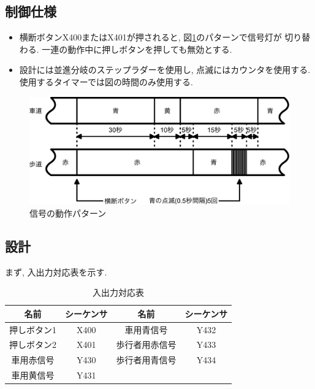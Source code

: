 \documentclass[titlepage]{jsarticle}
\begin{document}
  \subsection{制御仕様}
    \begin{itemize}
      \item 横断ボタンX400またはX401が押されると, 図\ref{fig:sig_pat}のパターンで信号灯が
        切り替わる. 一連の動作中に押しボタンを押しても無効とする.
      \item 設計には並進分岐のステップラダーを使用し, 点滅にはカウンタを使用する.
        使用するタイマーでは図の時間のみ使用する.
    \end{itemize}
    \begin{figure}[h]
      \centering
      \includegraphics[width=12cm]{images/timing.pdf}
      \caption{信号の動作パターン}
      \label{fig:sig_pat}
    \end{figure}
  \subsection{設計}
    まず, 入出力対応表を示す.
    \begin{table}[h]
      \caption{入出力対応表}
      \centering
      \begin{tabular}{c|c||c|c}
        \hline
        名前 &       シーケンサ & 名前 &         シーケンサ \\ \hline \hline
        押しボタン1 & X400 &     車用青信号 &    Y432 \\
        押しボタン2 & X401 &     歩行者用赤信号 & Y433 \\
        車用赤信号 &  Y430 &     歩行者用青信号 & Y434 \\
        車用黄信号 &  Y431 & & \\ \hline
      \end{tabular}
    \end{table}
\end{document}
